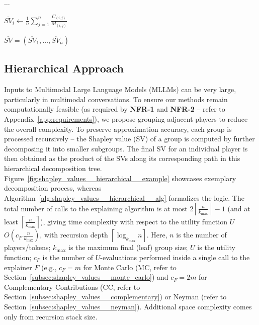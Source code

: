 \begin{algorithm}[H]
\begin{algorithmic}[1]
 
     
        \State $\dots$ 
    \EndFor
\EndFor

 
    \State $\overline{SV}_i \gets \frac{1}{n} \sum_{j = 1}^{n} \frac{C_{(i, j)}}{M_{(i, j)}}$
\EndFor

\State \Return $\overline{SV} = (\overline{SV}_1, \dots, \overline{SV}_n)$

\end{algorithmic}
\end{algorithm}

\subsection{Hierarchical Approach}
\label{subsec:shapley_values__hierarchical}

Inputs to Multimodal Large Language Models (MLLMs) can be very large, particularly in multimodal conversations. To ensure our methods remain computationally feasible (as required by \textbf{NFR-1} and \textbf{NFR-2} -- refer to Appendix~\ref{app:requirements}), we propose grouping adjacent players to reduce the overall complexity. To preserve approximation accuracy, each group is processed recursively -- the Shapley value (SV) of a group is computed by further decomposing it into smaller subgroups. The final SV for an individual player is then obtained as the product of the SVs along its corresponding path in this hierarchical decomposition tree. Figure~\ref{fig:shapley_values__hierarchical__example} showcases exemplary decomposition process, whereas Algorithm~\ref{alg:shapley_values__hierarchical__alg} formalizes the logic. The total number of calls to the explaining algorithm is at most
$2\left\lceil \frac{n}{k_{\max}} \right\rceil - 1$
(and at least $\left\lceil \frac{n}{k_{\max}} \right\rceil$),
giving time complexity with respect to the utility function $U$
$O\!\left(c_F\,\frac{n}{k_{\max}}\right)$,
with recursion depth $\left\lceil \log_{k_{\max}} n \right\rceil$. Here, $n$ is the number of players/tokens; $k_{\max}$ is the maximum final (leaf) group size; $U$ is the utility function; $c_F$ is the number of $U$-evaluations performed inside a single call to the explainer $F$ (e.g., $c_F=m$ for Monte Carlo (MC, refer to Section~\ref{subsec:shapley_values__monte_carlo}) and $c_F=2m$ for Complementary Contributions (CC, refer to Section~\ref{subsec:shapley_values__complementary}) or Neyman (refer to Section~\ref{subsec:shapley_values__neyman}). Additional space complexity comes only from recursion stack size.


